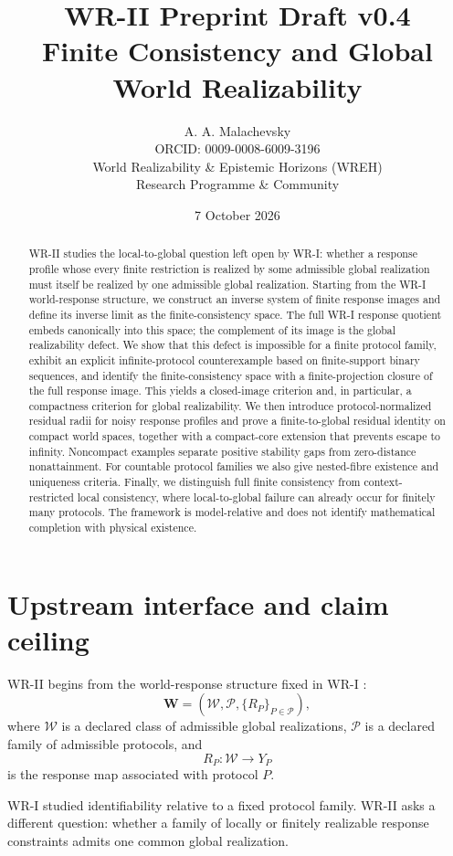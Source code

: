 \documentclass[11pt]{article}
\title{\textbf{WR-II Preprint Draft v0.4}\\[4pt]
\large Finite Consistency and Global World Realizability}
\author{A. A. Malachevsky\\
ORCID: 0009-0008-6009-3196\\
World Realizability \& Epistemic Horizons (WREH)\\
Research Programme \& Community}
\date{7 October 2026}
\newcommand{\W}{\mathcal W}
\newcommand{\Pcal}{\mathcal P}
\begin{document}
\maketitle

\begin{abstract}
WR-II studies the local-to-global question left open by WR-I: whether a response
profile whose every finite restriction is realized by some admissible global
realization must itself be realized by one admissible global realization.
Starting from the WR-I world-response structure, we construct an inverse system
of finite response images and define its inverse limit as the finite-consistency
space. The full WR-I response quotient embeds canonically into this space; the
complement of its image is the global realizability defect. We show that this
defect is impossible for a finite protocol family, exhibit an explicit
infinite-protocol counterexample based on finite-support binary sequences, and
identify the finite-consistency space with a finite-projection closure of the
full response image. This yields a closed-image criterion and, in particular,
a compactness criterion for global realizability. We then introduce
protocol-normalized residual radii for noisy response profiles and prove a
finite-to-global residual identity on compact world spaces, together with a
compact-core extension that prevents escape to infinity. Noncompact examples
separate positive stability gaps from zero-distance nonattainment. For
countable protocol families we also give nested-fibre existence and uniqueness
criteria. Finally, we distinguish full finite consistency from
context-restricted local consistency, where local-to-global failure can already
occur for finitely many protocols. The framework is model-relative and does
not identify mathematical completion with physical existence.
\end{abstract}

\section{Upstream interface and claim ceiling}

WR-II begins from the world-response structure fixed in WR-I
\cite{MalachevskyWRI}:
\[
\mathbf W=(\W,\Pcal,\{R_P\}_{P\in\Pcal}),
\]
where $\W$ is a declared class of admissible global realizations, $\Pcal$ is a
declared family of admissible protocols, and
\[
R_P:\W\to Y_P
\]
is the response map associated with protocol $P$.

WR-I studied identifiability relative to a fixed protocol family. WR-II asks a
different question: whether a family of locally or finitely realizable response
constraints admits one common global realization.
\end{document}
